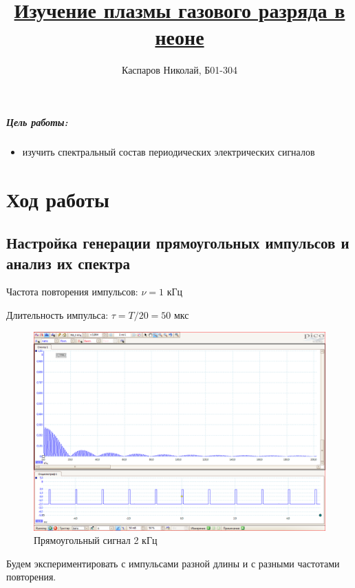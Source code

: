 \documentclass[a4paper]{article}
\title{\underline{Изучение плазмы газового разряда в неоне}}
\author{Каспаров Николай, Б01-304}
\begin{document}
\maketitle
\begin{center}
\Large{\textbf{ }}
\end{center}

\subparagraph{Цель работы:}

\begin{itemize}
\item изучить спектральный состав периодических электрических сигналов
\end{itemize}

\section{Ход работы}

\subsection{Настройка генерации прямоугольных импульсов и анализ их спектра}

Частота повторения импульсов: $\nu = 1$ кГц

Длительность импульса: $\tau = T / 20 = 50$ мкс

\begin{figure}[h!]
    \centering
    \includegraphics[width=0.5\pdfpagewidth]{Rect1.png}
    \caption{Прямоугольный сигнал 2 кГц}
\end{figure}

Будем экспериментировать с импульсами разной длины и с разными частотами повторения.
\end{document}
